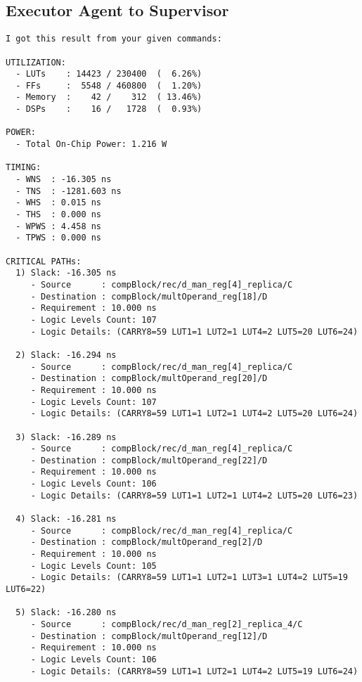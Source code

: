 \subsection{Executor Agent to Supervisor}
\vspace{-0.5em}
\begin{reviewerbox}
\begin{lstlisting}
I got this result from your given commands:

UTILIZATION:
  - LUTs    : 14423 / 230400  (  6.26%)
  - FFs     :  5548 / 460800  (  1.20%)
  - Memory  :    42 /    312  ( 13.46%)
  - DSPs    :    16 /   1728  (  0.93%)

POWER:
  - Total On-Chip Power: 1.216 W

TIMING:
  - WNS  : -16.305 ns
  - TNS  : -1281.603 ns
  - WHS  : 0.015 ns
  - THS  : 0.000 ns
  - WPWS : 4.458 ns
  - TPWS : 0.000 ns

CRITICAL PATHs:
  1) Slack: -16.305 ns
     - Source      : compBlock/rec/d_man_reg[4]_replica/C
     - Destination : compBlock/multOperand_reg[18]/D
     - Requirement : 10.000 ns
     - Logic Levels Count: 107
     - Logic Details: (CARRY8=59 LUT1=1 LUT2=1 LUT4=2 LUT5=20 LUT6=24)

  2) Slack: -16.294 ns
     - Source      : compBlock/rec/d_man_reg[4]_replica/C
     - Destination : compBlock/multOperand_reg[20]/D
     - Requirement : 10.000 ns
     - Logic Levels Count: 107
     - Logic Details: (CARRY8=59 LUT1=1 LUT2=1 LUT4=2 LUT5=20 LUT6=24)

  3) Slack: -16.289 ns
     - Source      : compBlock/rec/d_man_reg[4]_replica/C
     - Destination : compBlock/multOperand_reg[22]/D
     - Requirement : 10.000 ns
     - Logic Levels Count: 106
     - Logic Details: (CARRY8=59 LUT1=1 LUT2=1 LUT4=2 LUT5=20 LUT6=23)

  4) Slack: -16.281 ns
     - Source      : compBlock/rec/d_man_reg[4]_replica/C
     - Destination : compBlock/multOperand_reg[2]/D
     - Requirement : 10.000 ns
     - Logic Levels Count: 105
     - Logic Details: (CARRY8=59 LUT1=1 LUT2=1 LUT3=1 LUT4=2 LUT5=19 LUT6=22)

  5) Slack: -16.280 ns
     - Source      : compBlock/rec/d_man_reg[2]_replica_4/C
     - Destination : compBlock/multOperand_reg[12]/D
     - Requirement : 10.000 ns
     - Logic Levels Count: 106
     - Logic Details: (CARRY8=59 LUT1=1 LUT2=1 LUT4=2 LUT5=19 LUT6=24)
\end{lstlisting}
\end{reviewerbox}


